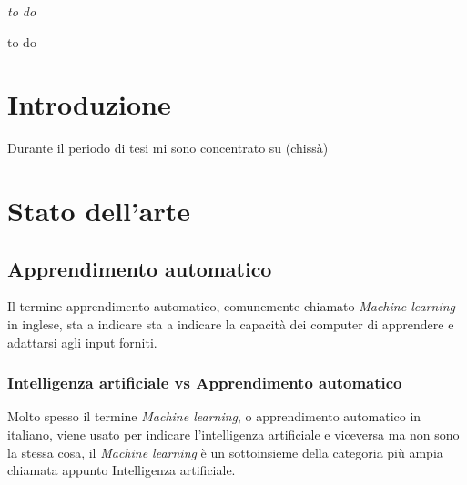 \documentclass[12pt,italian]{report}
\begin{document}
	
	\frontespizio
	\beforepreface
	
	
	{\raggedleft \large \sl to do\\
		
	}
	
	
	
	
	
	
	
	to do
	
	
	\afterpreface
	
	
	
	\chapter*{Introduzione}
	\label{cap:introduzione}
	Durante il periodo di tesi mi sono concentrato su (chissà)
	
	\chapter{Stato dell'arte}
	
	\section{Apprendimento automatico}
	Il termine apprendimento automatico, comunemente chiamato \textit{Machine learning} in inglese, sta a indicare sta a indicare la capacità dei computer di apprendere e adattarsi agli input forniti.
	\subsection{Intelligenza artificiale vs Apprendimento automatico}
	\label{machinelearning}
	Molto spesso il termine \textit{Machine learning}, o apprendimento automatico in italiano, viene usato per indicare l'intelligenza artificiale e viceversa ma non sono la stessa cosa, il \textit{Machine learning} è un sottoinsieme della categoria più ampia chiamata appunto Intelligenza artificiale.
 
\end{document}
